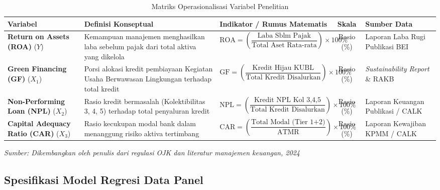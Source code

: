 \documentclass[12pt,a4paper]{article}
\numberwithin{equation}{section}
\begin{document}
\begin{table}[H]
  \caption{Matriks Operasionalisasi Variabel Penelitian}
  \label{tab:operasionalisasi_variabel}
  \small
  \begin{tabularx}{\textwidth}{|>{\raggedright\arraybackslash}p{2.1cm}|>{\raggedright\arraybackslash}X|>{\centering\arraybackslash}p{4.1cm}|c|>{\raggedright\arraybackslash}p{2.1cm}|}
    \hline
    \textbf{Variabel} & \textbf{Definisi Konseptual} & \textbf{Indikator / Rumus Matematis} & \textbf{Skala} & \textbf{Sumber Data} \\
    \hline
    \textbf{Return on Assets (ROA)} ($Y$) & Kemampuan manajemen menghasilkan laba sebelum pajak dari total aktiva yang dikelola \citep{Dendawijaya2015} & $\text{ROA} = \left(\dfrac{\text{Laba Sblm Pajak}}{\text{Total Aset Rata-rata}}\right) \times 100\%$ & Rasio (\%) & Laporan Laba Rugi Publikasi BEI \\
    \hline
    \textbf{Green Financing (GF)} ($X_1$) & Porsi alokasi kredit pembiayaan Kegiatan Usaha Berwawasan Lingkungan terhadap total kredit \citep{OJK2017} & $\text{GF} = \left(\dfrac{\text{Kredit Hijau KUBL}}{\text{Total Kredit Disalurkan}}\right) \times 100\%$ & Rasio (\%) & \emph{Sustainability Report} \& RAKB \\
    \hline
    \textbf{Non-Performing Loan (NPL)} ($X_2$) & Rasio kredit bermasalah (Kolektibilitas 3, 4, 5) terhadap total penyaluran kredit \citep{KuncoroSuhardjono2018} & $\text{NPL} = \left(\dfrac{\text{Kredit NPL Kol 3,4,5}}{\text{Total Kredit Disalurkan}}\right) \times 100\%$ & Rasio (\%) & Laporan Keuangan Publikasi / CALK \\
    \hline
    \textbf{Capital Adequacy Ratio (CAR)} ($X_3$) & Rasio kecukupan modal bank dalam menanggung risiko aktiva tertimbang \citep{BrighamEhrhardt2020} & $\text{CAR} = \left(\dfrac{\text{Total Modal (Tier 1+2)}}{\text{ATMR}}\right) \times 100\%$ & Rasio (\%) & Laporan Kewajiban KPMM / CALK \\
    \hline
  \end{tabularx}
  \begin{flushleft}
    \textit{Sumber: Dikembangkan oleh penulis dari regulasi OJK dan literatur manajemen keuangan, 2024}
  \end{flushleft}
\end{table}

\subsection{Spesifikasi Model Regresi Data Panel}
\end{document}
